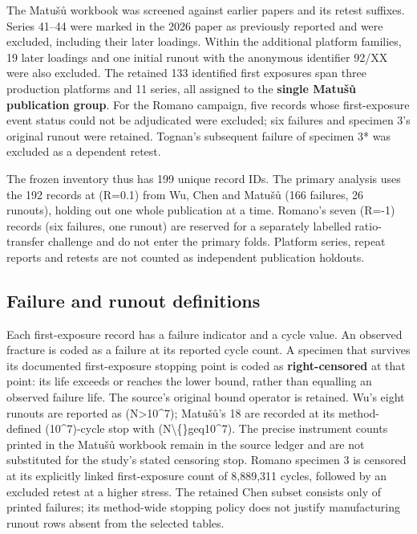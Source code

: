 \documentclass[12pt,a4paper]{article}
\begin{document}
The Matušů workbook was screened against earlier papers and its retest suffixes. Series 41–44 were marked in the 2026 paper as previously reported and were excluded, including their later loadings. Within the additional platform families, 19 later loadings and one initial runout with the anonymous identifier 92/XX were also excluded. The retained 133 identified first exposures span three production platforms and 11 series, all assigned to the \textbf{single Matušů publication group}. For the Romano campaign, five records whose first-exposure event status could not be adjudicated were excluded; six failures and specimen 3’s original runout were retained. Tognan’s subsequent failure of specimen 3* was excluded as a dependent retest.

The frozen inventory thus has 199 unique record IDs. The primary analysis uses the 192 records at (R=0.1) from Wu, Chen and Matušů (166 failures, 26 runouts), holding out one whole publication at a time. Romano’s seven (R=-1) records (six failures, one runout) are reserved for a separately labelled ratio-transfer challenge and do not enter the primary folds. Platform series, repeat reports and retests are not counted as independent publication holdouts.

\subsection{Failure and runout definitions}

Each first-exposure record has a failure indicator and a cycle value. An observed fracture is coded as a failure at its reported cycle count. A specimen that survives its documented first-exposure stopping point is coded as \textbf{right-censored} at that point: its life exceeds or reaches the lower bound, rather than equalling an observed failure life. The source’s original bound operator is retained. Wu’s eight runouts are reported as (N>10\textasciicircum{}7); Matušů’s 18 are recorded at its method-defined (10\textasciicircum{}7)-cycle stop with (N\textbackslash\{\}geq10\textasciicircum{}7). The precise instrument counts printed in the Matušů workbook remain in the source ledger and are not substituted for the study’s stated censoring stop. Romano specimen 3 is censored at its explicitly linked first-exposure count of 8,889,311 cycles, followed by an excluded retest at a higher stress. The retained Chen subset consists only of printed failures; its method-wide stopping policy does not justify manufacturing runout rows absent from the selected tables.
\end{document}
